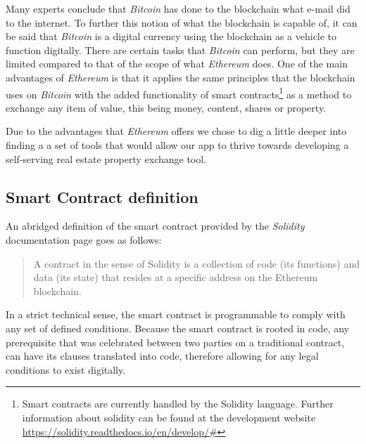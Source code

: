 \documentclass[submission,copyright,creativecommons]{eptcs}
\begin{document}
Many experts conclude that \textit{Bitcoin} has done to the blockchain what e-mail did to the internet.  To further this notion of what the blockchain is capable of, it can be said that \textit{Bitcoin} is a digital currency using the blockchain as a vehicle to function digitally.  There are certain tasks that \textit{Bitcoin} can perform, but they are limited compared to that of the scope of what \textit{Ethereum} does.  One of the main advantages of \textit{Ethereum} is that it applies the same principles that the blockchain uses on \textit{Bitcoin} with the added functionality of smart contracts\footnote{Smart contracts are currently handled by the Solidity language.  Further information about solidity can be found at the development website \url{https://solidity.readthedocs.io/en/develop/#}\cite{SoliditySolidity23}} as a method to exchange any item of value, this being money, content, shares or property.

Due to the advantages that \textit{Ethereum} offers we chose to dig a little deeper into finding a a set of tools that would allow our app to thrive towards developing a self-serving real estate property exchange tool.


\subsection{Smart Contract definition}
An abridged definition of the smart contract provided by the \textit{Solidity} documentation page goes as follows:
\begin{quote}
    A contract in the sense of Solidity is a collection of code (its functions) and data (its state) that resides at a specific address on the Ethereum blockchain.\cite{IntroductionSmartContracts}
\end{quote}
In a strict technical sense, the smart contract is programmable to comply with any set of defined conditions.  Because the smart contract is rooted in code, any prerequisite that was celebrated between two parties on a traditional contract, can have its clauses translated into code, therefore allowing for any legal conditions to exist digitally.
\end{document}
